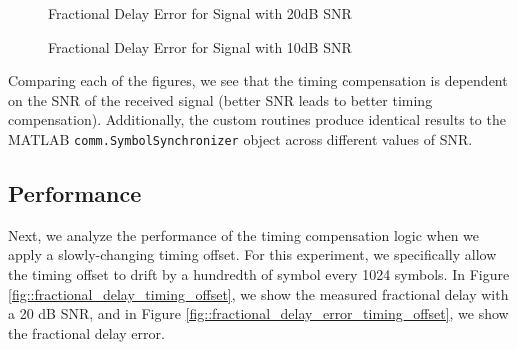 \documentclass{article}
\begin{document}
\begin{figure}[H]
	\centerline{}
	\caption{Fractional Delay Error for Signal with 20dB SNR}
	\label{fig::delay_error_20dB_snr}
\end{figure}

\begin{figure}[H]
	\centerline{}
	\caption{Fractional Delay Error for Signal with 10dB SNR}
	\label{fig::delay_error_10dB_snr}
\end{figure}

\noindent Comparing each of the figures, we see that the timing compensation is dependent on the SNR of the received signal (better SNR leads to better timing compensation). Additionally, the custom routines produce identical results to the MATLAB \texttt{comm.SymbolSynchronizer} object across different values of SNR.

\subsection{Performance}

Next, we analyze the performance of the timing compensation logic when we apply a slowly-changing timing offset. For this experiment, we specifically allow the timing offset to drift by a hundredth of symbol every 1024 symbols. In Figure \ref{fig::fractional_delay_timing_offset}, we show the measured fractional delay with a 20 dB SNR, and in Figure \ref{fig::fractional_delay_error_timing_offset}, we show the fractional delay error.
\end{document}
